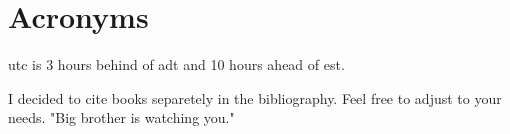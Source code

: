 	\section{Acronyms}


		\gls{utc} is 3 hours behind of \gls{adt} and 10 hours ahead of \gls{est}. \cite{texblog:2014}

		I decided to cite books separetely in the bibliography. Feel free to adjust to your needs. "Big brother is watching you." \cite{orwell1984}

